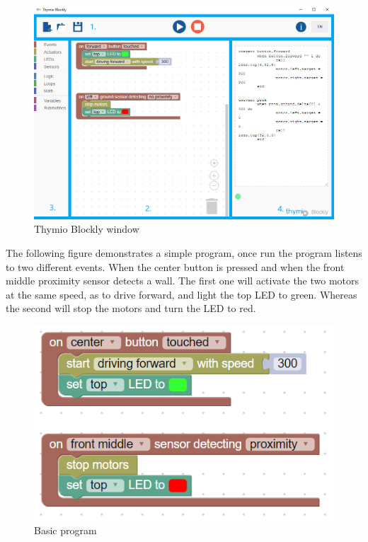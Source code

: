 \documentclass{scrartcl}
\begin{document}
\begin{figure}[h!]
  \centering
  \includegraphics[scale=0.5]{./Blockly/blockly_window}
  \caption{Thymio Blockly window}
  \label{fig:thymio_blockly_window}
\end{figure}

The following figure demonstrates a simple program, once run the program listens to two different events. When the center button is pressed and when the front middle proximity sensor detects a wall. 
The first one will activate the two motors at the same speed, as to drive forward, and light the top LED to green. Whereas the second will stop the motors and turn the LED to red. \\
\begin{figure}[h!]
  \centering
  \includegraphics[scale=0.5]{./Blockly/forward_stop_wall}
  \caption{Basic program}
  \label{fig:thymio_blockly_basic_program}
\end{figure}
\end{document}
